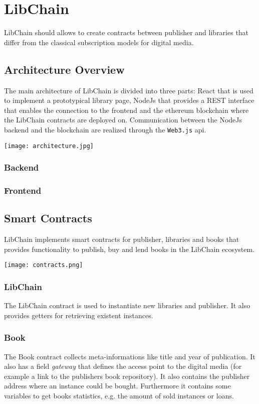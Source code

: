 \chapter{LibChain}
LibChain should allows to create contracts between publisher and libraries that differ from the classical subscription models for digital media. 


\section{Architecture Overview}
The main architecture of LibChain is divided into three parts: React that is used to implement a prototypical library page, NodeJs that provides a REST interface that enables the connection to the frontend and the ethereum blockchain where the LibChain contracts are deployed on. Communication between the NodeJs backend and the blockchain are realized through the \texttt{Web3.js} api.

\vspace{0.3cm}
\texttt{[image: architecture.jpg]}
\subsection{Backend}


\subsection{Frontend}


\section{Smart Contracts}
LibChain implements smart contracts for publisher, libraries and books that provides functionality to publish, buy and lend books in the LibChain ecosystem. 


\vspace{0.3cm}
\texttt{[image: contracts.png]}

\subsection{LibChain}
The LibChain contract is used to instantiate new libraries and publisher. It also provides getters for retrieving existent instances.

\subsection{Book}
The Book contract collects meta-informations like title and year of publication. It also has a field \textit{gateway} that defines the access point to the digital media (for example a link to the publishers book repository). It also contains the publisher address where an instance could be bought. Furthermore it contains some variables to get books statistics, e.g. the amount of sold instances or loans.


